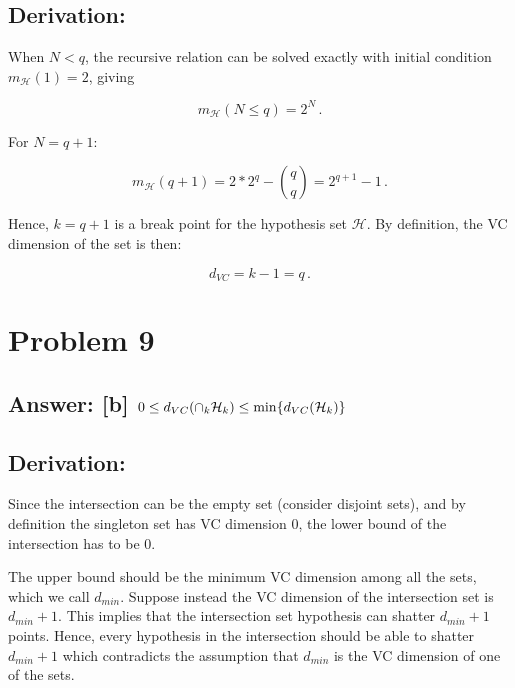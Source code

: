 \documentclass[11pt]{article}
\begin{document}
\hypertarget{derivation}{%
\subsection{Derivation:}\label{derivation}}

When \(N<q\), the recursive relation can be solved exactly with initial
condition \(m_{\mathcal{H}}(1)=2\), giving

\[
m_{\mathcal{H}}(N\le q)=2^N\,.
\]

For \(N=q+1\):

\[
m_{\mathcal{H}}(q+1)=2*2^{q}-{q\choose q}=2^{q+1}-1\,.
\]

Hence, \(k=q+1\) is a break point for the hypothesis set
\(\mathcal{H}\). By definition, the VC dimension of the set is then:

\[
d_{VC}=k-1=q\,.
\]

    \hypertarget{problem-9}{%
\section{Problem 9}\label{problem-9}}

\hypertarget{answer-b-0le-d_vccap_k-mathcalh_kle-rm-mind_vcmathcalh_k}{%
\subsection{\texorpdfstring{Answer: {[}b{]}
\(0\le d_{VC}(\cap_k \mathcal{H}_k)\le {\rm min}\{d_{VC}(\mathcal{H}_k)\}\)}{Answer: {[}b{]} 0\textbackslash{}le d\_\{VC\}(\textbackslash{}cap\_k \textbackslash{}mathcal\{H\}\_k)\textbackslash{}le \{\textbackslash{}rm min\}\textbackslash{}\{d\_\{VC\}(\textbackslash{}mathcal\{H\}\_k)\textbackslash{}\}}}\label{answer-b-0le-d_vccap_k-mathcalh_kle-rm-mind_vcmathcalh_k}}

\hypertarget{derivation}{%
\subsection{Derivation:}\label{derivation}}

Since the intersection can be the empty set (consider disjoint sets),
and by definition the singleton set has VC dimension 0, the lower bound
of the intersection has to be 0.

The upper bound should be the minimum VC dimension among all the sets,
which we call \(d_{min}\). Suppose instead the VC dimension of the
intersection set is \(d_{min}+1\). This implies that the intersection
set hypothesis can shatter \(d_{min}+1\) points. Hence, every hypothesis
in the intersection should be able to shatter \(d_{min}+1\) which
contradicts the assumption that \(d_{min}\) is the VC dimension of one
of the sets.
\end{document}
